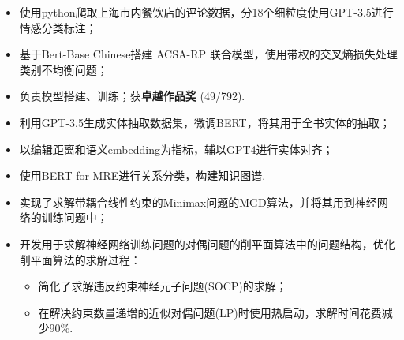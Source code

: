 \documentclass{resume}
\begin{document}
\begin{itemize}
	\item 使用python爬取上海市内餐饮店的评论数据，分18个细粒度使用GPT-3.5进行情感分类标注；
	\item 基于Bert-Base Chinese搭建 ACSA-RP 联合模型，使用带权的交叉熵损失处理类别不均衡问题；
	\item 负责模型搭建、训练；获\textbf{卓越作品奖} (49/792).
\end{itemize}


\begin{itemize}
	\item 利用GPT-3.5生成实体抽取数据集，微调BERT，将其用于全书实体的抽取；
	\item 以编辑距离和语义embedding为指标，辅以GPT4进行实体对齐；
	\item 使用BERT for MRE进行关系分类，构建知识图谱.
\end{itemize}

\begin{itemize}
	\item 实现了求解带耦合线性约束的Minimax问题的MGD算法，并将其用到神经网络的训练问题中；
	\item 开发用于求解神经网络训练问题的对偶问题的削平面算法中的问题结构，优化削平面算法的求解过程：
	      \begin{itemize}[label=$\ast$]
		      \item 简化了求解违反约束神经元子问题(SOCP)的求解；
		      \item 在解决约束数量递增的近似对偶问题(LP)时使用热启动，求解时间花费减少90\%.
	      \end{itemize}
\end{itemize}

\end{document}
